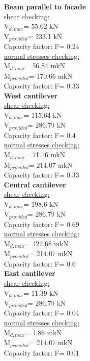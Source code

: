 \textbf{Beam parallel to facade} \\
\underline{shear checking:} \\
V$_{d,max}$= 55.02 kN \\ V$_{provided}$= 233.1 kN \\ Capacity factor: F= 0.24 \\
\underline{normal stresses checking:} \\
M$_{d,max}$= 56.84 mkN \\ M$_{provided}$= 170.66 mkN \\ Capacity factor: F= 0.33 \\


\textbf{West cantilever} \\
\underline{shear checking:} \\
V$_{d,max}$= 115.64 kN \\ V$_{provided}$= 286.79 kN \\ Capacity factor: F= 0.4 \\
\underline{normal stresses checking:} \\
M$_{d,max}$= 71.16 mkN \\ M$_{provided}$= 214.07 mkN \\ Capacity factor: F= 0.33 \\


\textbf{Central cantilever} \\
\underline{shear checking:} \\
V$_{d,max}$= 198.6 kN \\ V$_{provided}$= 286.79 kN \\ Capacity factor: F= 0.69 \\
\underline{normal stresses checking:} \\
M$_{d,max}$= 127.68 mkN \\ M$_{provided}$= 214.07 mkN \\ Capacity factor: F= 0.6 \\


\textbf{East cantilever} \\
\underline{shear checking:} \\
V$_{d,max}$= 11.39 kN \\ V$_{provided}$= 286.79 kN \\ Capacity factor: F= 0.04 \\
\underline{normal stresses checking:} \\
M$_{d,max}$= 1.86 mkN \\ M$_{provided}$= 214.07 mkN \\ Capacity factor: F= 0.01 \\


